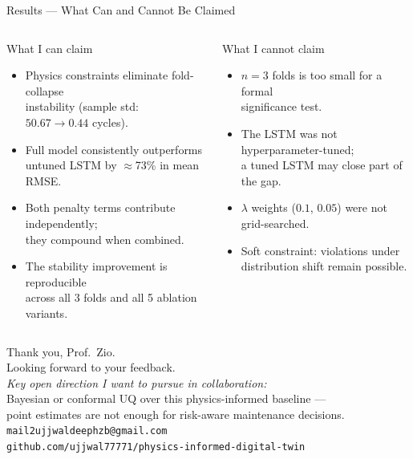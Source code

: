 \documentclass[10pt, aspectratio=169, handout]{beamer}
\begin{document}
\begin{frame}{Results --- What Can and Cannot Be Claimed}
  \begin{columns}[T]
      \begin{exampleblock}{\checkmark\; What I can claim}
        \small
        \begin{itemize}
          \setlength\itemsep{5pt}
          \item Physics constraints eliminate fold-collapse\\instability
                (sample std: $50.67 \to 0.44$ cycles).
          \item Full model consistently outperforms\\untuned LSTM by
                $\approx$73\% in mean RMSE.
          \item Both penalty terms contribute independently;\\they compound when combined.
          \item The stability improvement is reproducible\\across all 3 folds and
                all 5 ablation variants.
        \end{itemize}
      \end{exampleblock}

      \begin{alertblock}{\texttimes\; What I cannot claim}
        \small
        \begin{itemize}
          \setlength\itemsep{5pt}
          \item $n\!=\!3$ folds is too small for a formal\\significance test.
          \item The LSTM was not hyperparameter-tuned;\\a tuned LSTM may close part of the gap.
          \item $\lambda$ weights ($0.1$, $0.05$) were not\\grid-searched.
          \item Soft constraint: violations under\\distribution shift remain possible.
        \end{itemize}
      \end{alertblock}
  \end{columns}
\end{frame}

\begin{frame}[standout]
  Thank you, Prof.\ Zio.\\[8pt]
  {\normalsize Looking forward to your feedback.}\\[10pt]
  {\small\textit{Key open direction I want to pursue in collaboration:}\\[4pt]
  Bayesian or conformal UQ over this physics-informed baseline ---\\
  point estimates are not enough for risk-aware maintenance decisions.}\\[10pt]
  {\small
    \texttt{mail2ujjwaldeephzb@gmail.com}\\[5pt]
    \texttt{github.com/ujjwal77771/physics-informed-digital-twin}
  }
\end{frame}
\end{document}

